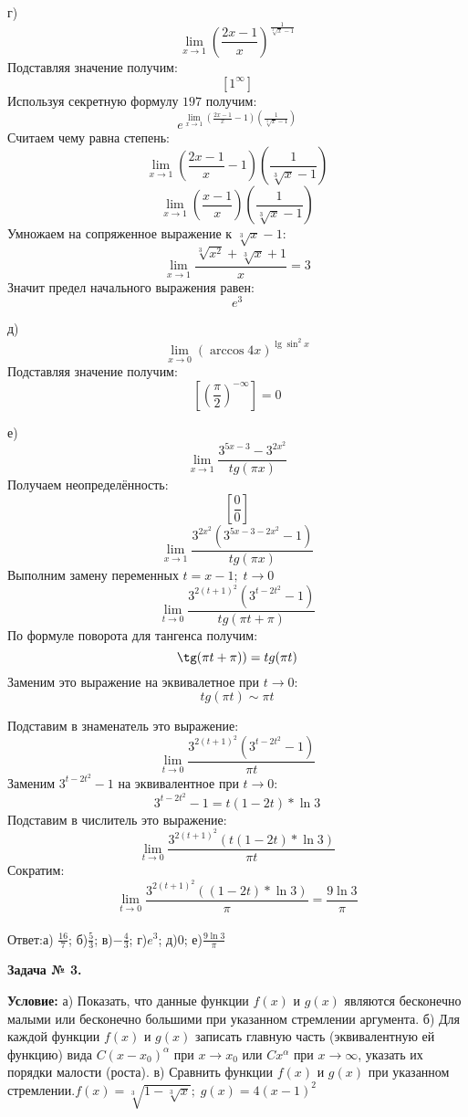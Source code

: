 \documentclass[12pt]{article}
\begin{document}
г)
$$\lim\limits_{x\rightarrow 1} (\frac{2x-1}{x})^{\frac{1}{\sqrt[3]{x}-1}}  $$
Подставляя значение получим:
$$[ 1^{\infty}]$$
Используя секретную формулу \textnumero $197$ получим:
$$e^{\lim\limits_{x\rightarrow 1} (\frac{2x-1}{x} - 1)({\frac{1}{\sqrt[3]{x}-1}})}$$
Считаем чему равна степень:
$$\lim\limits_{x\rightarrow 1} (\frac{2x-1}{x} - 1)({\frac{1}{\sqrt[3]{x}-1}})$$
$$\lim\limits_{x\rightarrow 1} (\frac{x-1}{x})({\frac{1}{\sqrt[3]{x}-1}})$$
Умножаем на сопряженное выражение к $\sqrt[3]{x}-1$:
$$\lim\limits_{x\rightarrow 1} \frac{\sqrt[3]{x^{2}} + \sqrt[3]{x}+1}{x}=3$$
Значит предел начального выражения равен:
$$e^{3}$$

д)
$$\lim\limits_{x\rightarrow 0} ({\arccos{4x}})^{\lg{\sin^2{x}}}$$
Подставляя значение получим:
$$[(\frac{\pi}{2})^{-\infty}]= 0$$

е)
$$\lim\limits_{x\rightarrow 1} \frac{3^{5x-3} - 3^{2x^{2}}}{tg(\pi x)}$$
Получаем неопределённость: $$[\frac{0}{0}]$$
$$\lim\limits_{x\rightarrow 1} \frac{3^{2x^{2}}(3^{5x-3-2x^{2}} - 1)}{{tg(\pi x)}}$$
Выполним замену переменных $t = x - 1;\; t \rightarrow 0$ 
$$\lim\limits_{t\rightarrow 0} \frac{3^{2(t+1)^{2}}(3^{t-2t^{2}} - 1)}{{tg(\pi t + \pi)}}$$
По формуле поворота для тангенса получим:
$$\tg(\pi t+ \pi))= tg(\pi t)$$
Заменим это выражение на эквивалетное при $t \rightarrow 0$:
$$tg(\pi t)  \sim \pi t$$

\newpage
Подставим в знаменатель это выражение:
$$\lim\limits_{t\rightarrow 0} \frac{3^{2(t+1)^{2}}(3^{t-2t^{2}} - 1)}{{\pi t }}$$
Заменим $3^{t-2t^{2}} - 1$ на эквивалентное при $t \rightarrow 0$:
$$3^{t-2t^{2}} - 1 = t(1-2t)*\ln{3}$$
Подставим в числитель это выражение:
$$\lim\limits_{t\rightarrow 0} \frac{3^{2(t+1)^{2}}(t(1-2t)*\ln{3})}{{\pi t }}$$
Сократим:
$$\lim\limits_{t\rightarrow 0} \frac{3^{2(t+1)^{2}}((1-2t)*\ln{3})}{{\pi}} = \frac{9\ln{3}}{\pi}$$ \\
Ответ:а) $\frac{16}{7}$; б)$\frac{5}{3}$; в)$-\frac{4}{3}$; г)$e^{3}$; д)$0$;
е)$\frac{9\ln{3}}{\pi}$

\newpage
\begin{center}
\textbf{Задача № 3.}   
\end{center}
\textbf{Условие:}
а) Показать, что данные функции $f(x)$ и $g(x)$ являются бесконечно малыми или бесконечно большими
при указанном стремлении аргумента. б) Для каждой функции $f(x)$ и $g(x)$ записать главную часть
(эквивалентную ей функцию)  вида $C(x-x_0)^{\alpha}$ при $x\rightarrow x_0$ или $Cx^{\alpha}$
при $x\rightarrow\infty$, указать их порядки малости (роста). в) Сравнить функции $f(x)$ и $g(x)$ при указанном стремлении.$f(x) = \sqrt[3]{1-{\sqrt[3]{x}}};\; g(x) = 4(x-1)^{2}$
\end{document}
